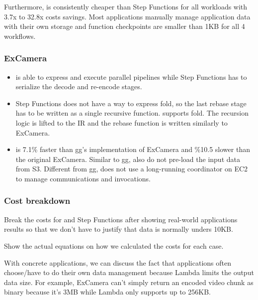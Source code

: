 Furthermore, \name{} is consistently cheaper than Step Functions for all
workloads with 3.7x to 32.8x costs savings. Most applications manually manage
application data with their own storage and function checkpoints are smaller
than 1KB for all 4 workflows.

\subsubsection{ExCamera}\label{sec:eval-excamera}

\begin{itemize}

    \item \name{} is able to express and execute parallel pipelines while Step
    Functions has to serialize the decode and re-encode stages.

    \item Step Functions does not have a way to express fold, so the last
    rebase stage has to be written as a single recursive function. \name{}
    supports fold. The recursion logic is lifted to the \name{} IR and the
    rebase function is written similarly to ExCamera.

    \item \name{} is 7.1\% faster than gg's implementation of ExCamera and
    \%10.5 slower than the original ExCamera. Similar to gg, \name{} also do
    not pre-load the input data from S3. Different from gg, \name{} does not
    use a long-running coordinator on EC2 to manage communications and
    invocations.

\end{itemize}



\subsubsection{Cost breakdown}

Break the costs for \name{} and Step Functions after showing real-world
applications results so that we don't have to justify that data is normally
unders 10KB.

Show the actual equations on how we calculated the costs for each case.

With concrete applications, we can discuss the fact that applications often
choose/have to do their own data management because Lambda limits the output
data size. For example, ExCamera can't simply return an encoded video chunk as
binary because it's 3MB while Lambda only supports up to 256KB.


